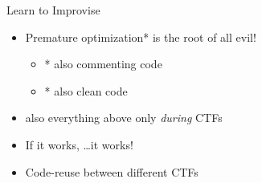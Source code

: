 









\begin{frame}
  {Learn to Improvise}

  \begin{itemize}
    \item Premature optimization* is the root of all evil!
      \begin{itemize}
        \item * also commenting code
        \item * also clean code
      \end{itemize}
    \item also everything above only \emph{during} CTFs
    \item If it works, \ldots it works!
    \item Code-reuse between different CTFs
  \end{itemize}

\end{frame}
